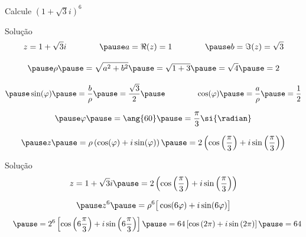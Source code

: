 \begin{question}
  Calcule \(\left(1+\sqrt{3}i\right)^6\)
\end{question}

\begin{resolution}{Solução}
  \[
    z = 1+\sqrt{3}i
    \qquad\qquad
    \pause
    a = \Re(z) = 1
    \qquad\qquad
    \pause
    b = \Im(z) = \sqrt{3}
  \]

  \[
    \pause
    \rho
    \pause
    = \sqrt{a^2 + b^2}
    \pause
    = \sqrt{1 + 3}
    \pause
    = \sqrt{4}
    \pause
    = 2
  \]

  \[
    \pause
    \sin(\varphi)
    \pause
    = \frac{b}{\rho}
    \pause
    = \frac{\sqrt{3}}{2}
    \pause
    \qquad\qquad
    \cos(\varphi)
    \pause
    = \frac{a}{\rho}
    \pause
    = \frac{1}{2}
  \]

  \[
    \pause
    \varphi
    \pause
    = \ang{60}
    \pause
    = \frac{\pi}{3} \si{\radian}
  \]

  \[
    \pause
    z
    \pause
    = \rho\left(\cos(\varphi)+i\sin(\varphi)\right)
    \pause
    = 2\left(\cos\left(\frac{\pi}{3}\right)+i\sin\left(\frac{\pi}{3}\right)\right)
  \]
\end{resolution}

\begin{resolution}{Solução}
  \[
    z = 1+\sqrt{3}i
    \pause
    = 2\left(\cos\left(\frac{\pi}{3}\right)+i\sin\left(\frac{\pi}{3}\right)\right)
  \]

  \vspace{0\baselineskip}
  \[
    \pause
    z^6
    \pause
    = \rho^6 \big[\cos(6\varphi) + i\sin(6\varphi)\big]
    \]
    \[
    \hphantom{z^6}
    \pause
    = 2^6 \left[\cos\left(6\frac{\pi}{3}\right) + i\sin\left(6\frac{\pi}{3}\right)\right]
    \pause
    = 64  \left[\cos\left(2\pi\right) + i\sin\left(2\pi\right)\right]
    \pause
    = 64
  \]
\end{resolution}


